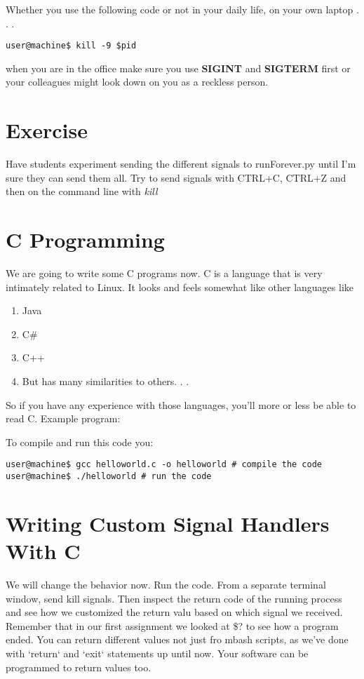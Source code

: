 \documentclass[12pt]{article}
\begin{document}
Whether you use the following code or not in your daily life, on your own laptop . . .

\begin{lstlisting}
user@machine$ kill -9 $pid
\end{lstlisting}

when you are in the office make sure you use \textbf{SIGINT} and \textbf{SIGTERM} first or your colleagues might look down on you as a reckless person.


\section{Exercise}

Have students experiment sending the different signals to runForever.py until I'm sure they can send them all.
Try to send signals with CTRL+C, CTRL+Z and then on the command line with \textit{kill}

\section{C Programming}

We are going to write some C programs now. C is a language that is very intimately related to Linux. It looks and feels somewhat like other languages like 
\begin{enumerate}
\item Java
\item C\#
\item C++
\item But has many similarities to others. . .
\end{enumerate}

So if you have any experience with those languages, you'll more or less be able to read C.
Example program:



To compile and run this code you:

\begin{lstlisting}
user@machine$ gcc helloworld.c -o helloworld # compile the code
user@machine$ ./helloworld # run the code
\end{lstlisting}

\section{Writing Custom Signal Handlers With C}

We will change the behavior now. Run the code. From a separate terminal window, send kill signals. Then inspect the return code of the running process and see how we customized the return valu based on which signal we received. Remember that in our first assignment we looked at \$? to see how a program ended. You can return different values not just fro mbash scripts, as we've done with `return` and `exit` statements up until now. Your software can be programmed to return values too.
\end{document}
